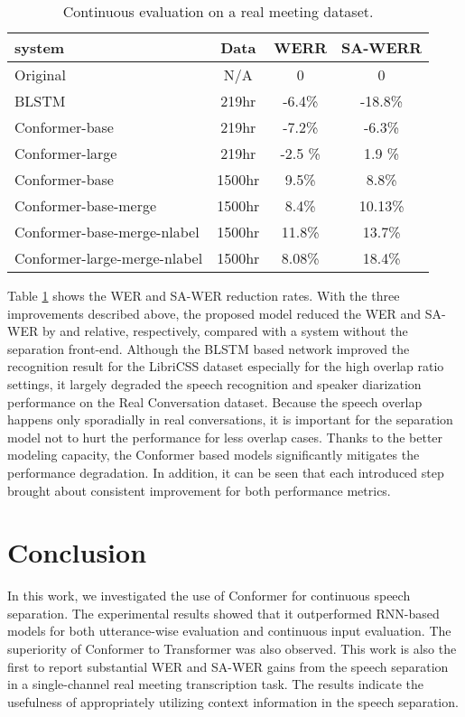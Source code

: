 \documentclass{article}
\begin{document}
	
	\begin{table}[!h]
		\centering
		\caption{Continuous evaluation on a real meeting dataset.}
		\label{tab:prod}


\begin{tabular}{l|c|cc}
			\toprule
			\textbf{system}& Data & WERR & SA-WERR   \\ 	
			\midrule
			Original  & N/A & 0 & 0 \\
			BLSTM & 219hr & -6.4\% & -18.8\% \\
			Conformer-base & 219hr & -7.2\% & -6.3\% \\
			Conformer-large& 219hr & -2.5 \% & 1.9 \% \\
			Conformer-base &1500hr & 9.5\% & 8.8\% \\
			Conformer-base-merge& 1500hr & 8.4\% & 10.13\% \\
			Conformer-base-merge-nlabel& 1500hr & 11.8\% & 13.7\% \\
			Conformer-large-merge-nlabel & 1500hr & 8.08\% & 18.4\% \\
			\bottomrule
		\end{tabular}
		
	\end{table}	
	
	
	Table  \ref{tab:prod} shows the WER and SA-WER reduction rates. 
	With the three improvements described above, the proposed model reduced the WER and SA-WER by   and  relative, respectively, compared with a system without the separation front-end. Although the BLSTM based network improved the recognition result for the LibriCSS dataset especially for the high overlap ratio settings, it largely degraded the speech recognition and speaker diarization performance on the Real Conversation dataset. Because the speech overlap happens only sporadially in real conversations, it is important for the separation model not to hurt the performance for less overlap cases. 
Thanks to the better modeling capacity, the Conformer based models significantly mitigates the performance degradation. In addition, it can be seen that each introduced step brought about consistent improvement for both performance metrics. 


	


	
	\section{Conclusion}
	In this work, we investigated the use of Conformer for continuous speech separation. The experimental results showed that it  outperformed  RNN-based models for both utterance-wise evaluation and continuous input evaluation. 
	The superiority of Conformer to Transformer was also observed. 
	This work is also the first to report 
	substantial WER and SA-WER gains from the speech separation in a single-channel real meeting transcription task. 
	The results indicate the usefulness of appropriately utilizing context information in the speech separation. 
	
	


	

	
	
\end{document}
